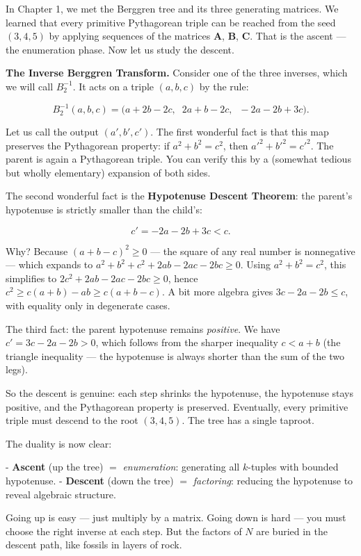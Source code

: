 \documentclass[12pt, letterpaper, openany]{book}
\theoremstyle{definition}
\theoremstyle{remark}
\begin{document}
In Chapter 1, we met the Berggren tree and its three generating matrices. We learned that every primitive Pythagorean triple can be reached from the seed $(3, 4, 5)$ by applying sequences of the matrices $\mathbf{A}$, $\mathbf{B}$, $\mathbf{C}$. That is the ascent --- the enumeration phase. Now let us study the descent.

\textbf{The Inverse Berggren Transform.} Consider one of the three inverses, which we will call $B_2^{-1}$. It acts on a triple $(a, b, c)$ by the rule:

\[
B_2^{-1}(a, b, c) = \big(a + 2b - 2c,\;\; 2a + b - 2c,\;\; -2a - 2b + 3c\big).
\]

Let us call the output $(a', b', c')$. The first wonderful fact is that this map preserves the Pythagorean property: if $a^2 + b^2 = c^2$, then $a'^2 + b'^2 = c'^2$. The parent is again a Pythagorean triple. You can verify this by a (somewhat tedious but wholly elementary) expansion of both sides.

The second wonderful fact is the \textbf{Hypotenuse Descent Theorem}: the parent's hypotenuse is strictly smaller than the child's:

\[
c' = -2a - 2b + 3c < c.
\]

Why? Because $(a + b - c)^2 \geq 0$ --- the square of any real number is nonnegative --- which expands to $a^2 + b^2 + c^2 + 2ab - 2ac - 2bc \geq 0$. Using $a^2 + b^2 = c^2$, this simplifies to $2c^2 + 2ab - 2ac - 2bc \geq 0$, hence $c^2 \geq c(a + b) - ab \geq c(a + b - c)$. A bit more algebra gives $3c - 2a - 2b \leq c$, with equality only in degenerate cases.

The third fact: the parent hypotenuse remains \textit{positive}. We have $c' = 3c - 2a - 2b > 0$, which follows from the sharper inequality $c < a + b$ (the triangle inequality --- the hypotenuse is always shorter than the sum of the two legs).

So the descent is genuine: each step shrinks the hypotenuse, the hypotenuse stays positive, and the Pythagorean property is preserved. Eventually, every primitive triple must descend to the root $(3, 4, 5)$. The tree has a single taproot.

The duality is now clear:

- \textbf{Ascent} (up the tree) $=$ \textit{enumeration}: generating all $k$-tuples with bounded hypotenuse.
- \textbf{Descent} (down the tree) $=$ \textit{factoring}: reducing the hypotenuse to reveal algebraic structure.

Going up is easy --- just multiply by a matrix. Going down is hard --- you must choose the right inverse at each step. But the factors of $N$ are buried in the descent path, like fossils in layers of rock.
\end{document}

